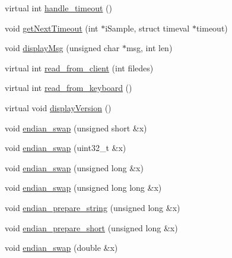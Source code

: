 \begin{DoxyCompactItemize}
\item 
virtual int \hyperlink{classBaseServer_abf4522aaa35b5d912f52e0fa37ebac7f}{handle\-\_\-timeout} ()
\item 
void \hyperlink{classBaseServer_a7144e0d3ba2ea07df19aaa45eee2f88d}{get\-Next\-Timeout} (int $\ast$i\-Sample, struct timeval $\ast$timeout)
\item 
void \hyperlink{classBaseServer_a3b0303f1db9d43aa3fcbb5ff3b1fac00}{display\-Msg} (unsigned char $\ast$msg, int len)
\item 
virtual int \hyperlink{classBaseServer_a113ea8f8a7513c5de594c7450c15f88e}{read\-\_\-from\-\_\-client} (int filedes)
\item 
virtual int \hyperlink{classBaseServer_adcd355f20c31da752d9c96d70ab44533}{read\-\_\-from\-\_\-keyboard} ()
\item 
virtual void \hyperlink{classBaseServer_a138c082fc43509f250ffd34e1748335b}{display\-Version} ()
\item 
void \hyperlink{classBaseServer_a3277d0713a661a87bb64a42e7f7f9adc}{endian\-\_\-swap} (unsigned short \&x)
\item 
void \hyperlink{classBaseServer_a1f74086ad80ccab0d132b9e6ae026931}{endian\-\_\-swap} (uint32\-\_\-t \&x)
\item 
void \hyperlink{classBaseServer_a80490b4fe26e45a7de5f500af59a43e2}{endian\-\_\-swap} (unsigned long \&x)
\item 
void \hyperlink{classBaseServer_afb5c1352240c2db41febc6a666881ae3}{endian\-\_\-swap} (unsigned long long \&x)
\item 
void \hyperlink{classBaseServer_a97d6e2df8169b3f8da02099626612848}{endian\-\_\-prepare\-\_\-string} (unsigned long \&x)
\item 
void \hyperlink{classBaseServer_af4c5ce4338acc13dcf5d6e4829ba27dc}{endian\-\_\-prepare\-\_\-short} (unsigned long \&x)
\item 
void \hyperlink{classBaseServer_a6628b9fe3bc35e7814ddc2b68564c4aa}{endian\-\_\-swap} (double \&x)
\end{DoxyCompactItemize}
